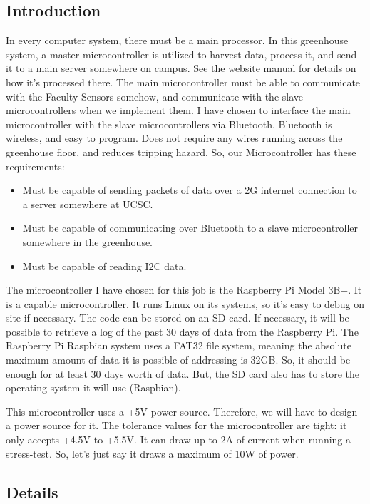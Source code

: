 \subsection{Introduction}
In every computer system, there must be a main processor. In this greenhouse system, a master microcontroller is utilized to harvest data, process it, and send it to a main server somewhere on campus. See the website manual for details on how it’s processed there. The main microcontroller must be able to communicate with the Faculty Sensors somehow, and communicate with the slave microcontrollers when we implement them. I have chosen to interface the main microcontroller with the slave microcontrollers via Bluetooth. Bluetooth is wireless, and easy to program. Does not require any wires running across the greenhouse floor, and reduces tripping hazard. So, our Microcontroller  has these requirements:
\begin{itemize}
	\item Must be capable of sending packets of data over a 2G internet connection to a server somewhere at UCSC.
	\item Must be capable of communicating over Bluetooth to a slave microcontroller somewhere in the greenhouse.
	\item Must be capable of reading I2C data.
\end{itemize}

\par
The microcontroller I have chosen for this job is the Raspberry Pi Model 3B+. It is a capable microcontroller. It runs Linux on its systems, so it’s easy to debug on site if necessary. The code can be stored on an SD card. If necessary, it will be possible to retrieve a log of the past 30 days of data from the Raspberry Pi. The Raspberry Pi Raspbian system uses a FAT32 file system, meaning the absolute maximum amount of data it is possible of addressing is 32GB. So, it should be enough for at least 30 days worth of data. But, the SD card also has to store the operating system it will use (Raspbian). 
\par
This microcontroller uses a +5V power source. Therefore, we will have to design a power source for it. The tolerance values for the microcontroller are tight: it only accepts +4.5V to +5.5V. It can draw up to 2A of current when running a stress-test. So, let’s just say it draws a maximum of 10W of power.

\subsection{Details}

